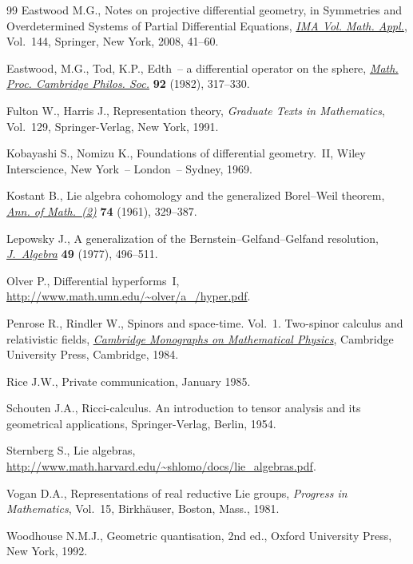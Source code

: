 \documentclass[11pt]{article}
\begin{document}
\begin{thebibliography}{99}
Eastwood M.G.,
Notes on projective dif\/ferential geometry,
in Symmetries and Overdetermined Systems of Partial Dif\/ferential Equations,
\href{http://dx.doi.org/10.1007/978-0-387-73831-4_3}{{\it IMA Vol. Math. Appl.}}, Vol.~144, Springer, New York, 2008,  41--60.

Eastwood, M.G., Tod, K.P.,
Edth~-- a dif\/ferential operator on the sphere,
\href{http://dx.doi.org/10.1017/S0305004100059971}{{\it Math. Proc. Cambridge Philos. Soc.}} {\bf 92} (1982), 317--330.

Fulton W., Harris J.,
Representation theory, {\it Graduate Texts in Mathematics}, Vol.~129, Springer-Verlag, New York, 1991.

Kobayashi S., Nomizu K.,
Foundations of dif\/ferential geometry.~II,
Wiley Interscience, New York~-- London~-- Sydney, 1969.

Kostant B.,
Lie algebra cohomology and the generalized Borel--Weil theorem,
\href{http://dx.doi.org/10.2307/1970237}{{\it Ann. of Math.~(2)}} {\bf 74} (1961), 329--387.

Lepowsky J.,
A generalization of the Bernstein--Gelfand--Gelfand resolution,
\href{http://dx.doi.org/10.1016/0021-8693(77)90254-X}{{\it J.~Algebra}} {\bf 49} (1977), 496--511.

Olver P.,
Dif\/ferential hyperforms~I,
\url{http://www.math.umn.edu/~olver/a_/hyper.pdf}.

Penrose R., Rindler W.,
Spinors and space-time. Vol.~1. Two-spinor calculus and relativistic f\/ields,
\href{http://dx.doi.org/10.1017/CBO9780511564048}{{\it Cambridge Monographs on Mathematical Physics}}, Cambridge University Press, Cambridge, 1984.

Rice J.W.,
Private communication, January 1985.

Schouten J.A.,
Ricci-calculus. An introduction to tensor analysis and its geometrical applications,
Springer-Verlag, Berlin, 1954.

Sternberg S., Lie algebras,
\url{http://www.math.harvard.edu/~shlomo/docs/lie_algebras.pdf}.



Vogan D.A.,
Representations of real reductive Lie groups,
{\it Progress in Mathematics}, Vol.~15, Birkh\"auser, Boston, Mass., 1981.

Woodhouse N.M.J.,
Geometric quantisation,
2nd ed., Oxford University Press, New York, 1992.

\end{thebibliography}
\end{document}
